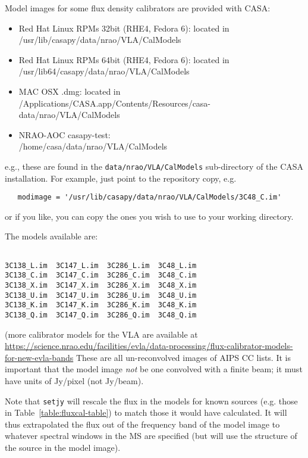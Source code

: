 Model images for some flux density calibrators are provided with CASA:
\begin{itemize}
   \item Red Hat Linux RPMs 32bit (RHE4, Fedora 6): 
         located in\\ /usr/lib/casapy/data/nrao/VLA/CalModels
   \item Red Hat Linux RPMs 64bit (RHE4, Fedora 6): 
         located in\\ /usr/lib64/casapy/data/nrao/VLA/CalModels
   \item MAC OSX .dmg: located in\\ /Applications/CASA.app/Contents/Resources/casa-data/nrao/VLA/CalModels
   \item NRAO-AOC casapy-test:\\ /home/casa/data/nrao/VLA/CalModels
\end{itemize}
e.g., these are found in the {\tt data/nrao/VLA/CalModels}
sub-directory of the CASA installation.  For example, just point to the
repository copy, e.g.
\small
\begin{verbatim}
   modimage = '/usr/lib/casapy/data/nrao/VLA/CalModels/3C48_C.im'
\end{verbatim}
\normalsize
or if you like, you can copy the ones you wish to use to your working
directory.

The models available are:
\small
\begin{verbatim}

3C138_L.im  3C147_L.im  3C286_L.im  3C48_L.im
3C138_C.im  3C147_C.im  3C286_C.im  3C48_C.im
3C138_X.im  3C147_X.im  3C286_X.im  3C48_X.im
3C138_U.im  3C147_U.im  3C286_U.im  3C48_U.im
3C138_K.im  3C147_K.im  3C286_K.im  3C48_K.im
3C138_Q.im  3C147_Q.im  3C286_Q.im  3C48_Q.im
\end{verbatim}

(more calibrator models for the VLA are available at\\
\url{https://science.nrao.edu/facilities/evla/data-processing/flux-calibrator-models-for-new-evla-bands}
\normalsize
These are all un-reconvolved images of AIPS CC lists.  
It is important that the model image {\em not} be one
convolved with a finite beam; it must have units of Jy/pixel (not
Jy/beam).  

Note that {\tt setjy} will rescale the flux in the models for known
sources (e.g. those in Table~\ref{table:fluxcal-table}) to match those
it would have calculated.  It will thus extrapolated the flux out of
the frequency band of the model image to whatever spectral windows
in the MS are specified (but will use the structure of the source
in the model image).

